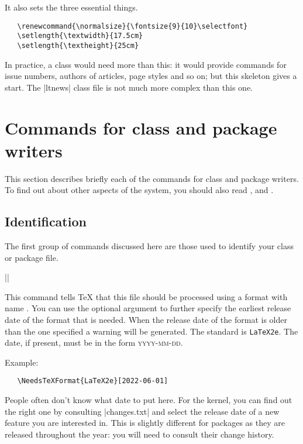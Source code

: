 \documentclass{ltxguide}
\begin{document}
It also sets the three essential things.
\begin{verbatim}
   \renewcommand{\normalsize}{\fontsize{9}{10}\selectfont}
   \setlength{\textwidth}{17.5cm}
   \setlength{\textheight}{25cm}
\end{verbatim}
In practice, a class would need more than this: it would provide commands for
issue numbers, authors of articles, page styles and so on; but this skeleton
gives a start. The |ltnews| class file is not much more complex than this one.

\section{Commands for class and package writers}
\label{Sec:commands}

This section describes briefly each of the commands for class and package
writers. To find out about other aspects of the system,
you should also read \emph{\LaTeXbook}, \emph{\LaTeXcomp} and
\emph{\usrguide}.

\subsection{Identification}

The first group of commands discussed here are those used to identify your
class or package file.

\begin{decl}
|\NeedsTeXFormat|  
\end{decl}
This command tells \TeX{} that this file should be processed using a format
with name . You can use the optional argument 
to further specify the earliest release date of the format that is needed. When
the release date of the format is older than the one specified a warning will
be generated. The standard  is \texttt{LaTeX2e}. The date, if
present, must be in the form \textsc{yyyy-mm-dd}.

Example:
\begin{verbatim}
   \NeedsTeXFormat{LaTeX2e}[2022-06-01]
\end{verbatim}
People often don't know what date to put here. For the kernel, you can find out
the right one by consulting |changes.txt| and select the release date of a new
feature you are interested in. This is slightly different for packages as they
are released throughout the year: you will need to consult their change
history.
\end{document}
